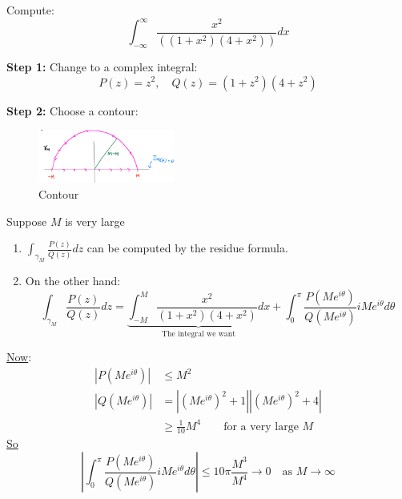 \begin{example}
    Compute:
    \begin{equation*}
        \int_{-\infty}^{\infty} \frac{x^2}{((1 + x^2)(4+ x^2))} dx
    \end{equation*}

    \textbf{Step 1:} Change to a complex integral:
    \begin{equation*}
        P(z) = z^2, \quad Q(z) = (1 + z^2)(4 + z^2)
    \end{equation*}

    \textbf{Step 2:} Choose a contour:
    \begin{figure}[H]
        \centering
        \includegraphics[width=0.4\textwidth]{LECTURE_11/contour.png}
        \caption{Contour}
        \label{fig:contour}
    \end{figure}
    Suppose $M$ is very large
    \begin{enumerate}
        \item $\int_{\gamma_M} \frac{P(z)}{Q(z)} dz$ can be computed by the residue formula.
        \item On the other hand:
              \begin{equation*}
                  \int_{\gamma_M} \frac{P(z)}{Q(z)} dz = \underbrace{\int_{-M}^{M}\frac{x^2}{(1 + x^2)(4 + x^2)} dx}_{\text{The integral we want}} + \int_{0}^{\pi} \frac{P(M e^{i\theta})}{Q(M e^{i\theta})} i M e^{i\theta} d\theta
              \end{equation*}
    \end{enumerate}
    \underline{Now}:
    \begin{align*}
        |P(Me^{i\theta})| & \leq M^2                                                \\
        |Q(Me^{i\theta})| & = |(Me^{i\theta})^2 + 1||(Me^{i\theta})^2 + 4|          \\
                          & \geq \frac{1}{10} M^4 \qquad \text{for a very large } M
    \end{align*}
    \underline{So}
    \begin{equation*}
        \left| \int_0^\pi \frac{P(Me^{i\theta})}{Q(Me^{i\theta})} i M e^{i\theta} d\theta \right| \leq 10 \pi \frac{M^3}{M^4} \to 0 \quad \text{as } M \to \infty
    \end{equation*}

\end{example}
